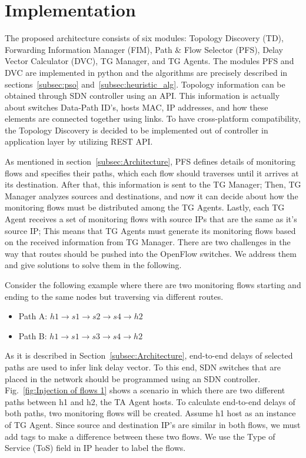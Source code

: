 \documentclass[10pt, journal, letterpaper]{IEEEtran}
\begin{document}
\section{Implementation}\label{sec:implementation}
The proposed architecture consists of six modules: Topology Discovery (TD), Forwarding Information Manager (FIM), Path $\&$ Flow Selector (PFS), Delay Vector Calculator (DVC), TG Manager, and TG Agents. The modules PFS and DVC are implemented in python and the algorithms are precisely described in sections~\ref{subsec:pso} and~\ref{subsec:heuristic_alg}. Topology information can be obtained through SDN controller using an API. This information is actually about switches Data-Path ID's, hosts MAC, IP addresses, and how these elements are connected together using links. To have cross-platform compatibility, the Topology Discovery is decided to be implemented out of controller in application layer by utilizing REST API.

As mentioned in section~\ref{subsec:Architecture}, PFS defines details of monitoring flows and specifies their paths, which each flow should traverses until it arrives at its destination. After that, this information is sent to the TG Manager; Then, TG Manager analyzes sources and destinations, and now it can decide about how the monitoring flows must be distributed among the TG Agents. Lastly, each TG Agent receives a set of monitoring flows with source IPs that are the same as it's source IP; This means that TG Agents must generate its monitoring flows based on the received information from TG Manager. There are two challenges in the way that routes should be pushed into the OpenFlow switches. We address them and give solutions to solve them in the following.

Consider the following example where there are two monitoring flows starting and ending to the same nodes but traversing via different routes.
\begin{itemize}
    \item Path A: $h1\rightarrow s1\rightarrow s2\rightarrow s4\rightarrow h2$
    \item Path B: $h1\rightarrow s1\rightarrow s3\rightarrow s4\rightarrow h2$
\end{itemize}

As it is described in Section~\ref{subsec:Architecture}, end-to-end delays of selected paths are used to infer link delay vector. To this end, SDN switches that are placed in the network should be programmed using an SDN controller. Fig.~\ref{fig:Injection of flows 1} shows a scenario in which there are two different paths between h1 and h2, the TA Agent hosts. To calculate end-to-end delays of both paths, two monitoring flows will be created. Assume h1 host as an instance of TG Agent. Since source and destination IP's are similar in both flows, we must add tags to make a difference between these two flows. We use the Type of Service (ToS) field in IP header to label the flows. 
\end{document}
